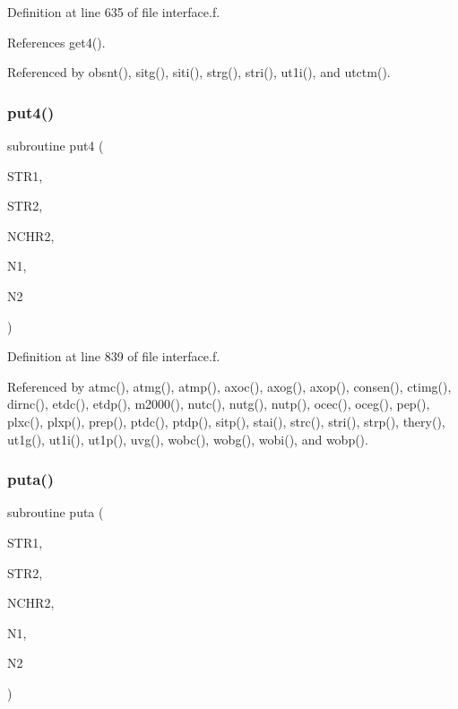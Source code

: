 Definition at line 635 of file interface.\+f.



References get4().



Referenced by obsnt(), sitg(), siti(), strg(), stri(), ut1i(), and utctm().

\mbox{\label{interface_8f_ae24d34be5944d9b663113269d70f25c5}} 
\subsubsection{\texorpdfstring{put4()}{put4()}}
{\footnotesize\ttfamily subroutine put4 (\begin{DoxyParamCaption}\item[{character$\ast$14}]{S\+T\+R1,  }\item[{real$\ast$8, dimension(nchr2,n1)}]{S\+T\+R2,  }\item[{integer$\ast$2}]{N\+C\+H\+R2,  }\item[{integer$\ast$2}]{N1,  }\item[{integer$\ast$2}]{N2 }\end{DoxyParamCaption})}



Definition at line 839 of file interface.\+f.



Referenced by atmc(), atmg(), atmp(), axoc(), axog(), axop(), consen(), ctimg(), dirnc(), etdc(), etdp(), m2000(), nutc(), nutg(), nutp(), ocec(), oceg(), pep(), plxc(), plxp(), prep(), ptdc(), ptdp(), sitp(), stai(), strc(), stri(), strp(), thery(), ut1g(), ut1i(), ut1p(), uvg(), wobc(), wobg(), wobi(), and wobp().

\mbox{\label{interface_8f_a4c20993a508f8cf61100bdcc9883ee15}} 
\subsubsection{\texorpdfstring{puta()}{puta()}}
{\footnotesize\ttfamily subroutine puta (\begin{DoxyParamCaption}\item[{character$\ast$14}]{S\+T\+R1,  }\item[{character$\ast$1, dimension(2$\ast$nchr2)}]{S\+T\+R2,  }\item[{integer$\ast$2}]{N\+C\+H\+R2,  }\item[{integer$\ast$2}]{N1,  }\item[{integer$\ast$2}]{N2 }\end{DoxyParamCaption})}



